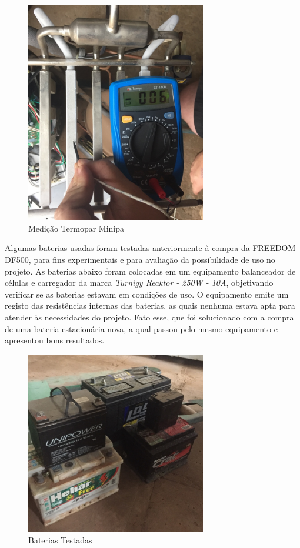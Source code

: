 \begin{figure}[H]
    \centering
    \includegraphics[width=0.7\textwidth]{figuras/medicao_termopar}
    \caption{Medição Termopar Minipa}
    \label{fig:medicao_termopar}
\end{figure}

		 Algumas baterias usadas foram testadas anteriormente à compra da FREEDOM DF500, para fins experimentais e para avaliação da possibilidade de uso no projeto. As baterias abaixo foram colocadas em um equipamento balanceador de células e carregador da marca \textit{Turnigy Reaktor - 250W - 10A}, objetivando verificar se as baterias estavam em condições de uso. O equipamento emite um registo das resistências internas das baterias, as quais nenhuma estava apta para atender às necessidades do projeto. Fato esse, que foi solucionado com a compra de uma bateria estacionária nova, a qual passou pelo mesmo equipamento e apresentou bons resultados.

  \begin{figure}[H]
    \centering
    \includegraphics[width=0.7\textwidth]{figuras/baterias_testadas}
    \caption{Baterias Testadas}
    \label{fig:baterias_testadas}
\end{figure}

